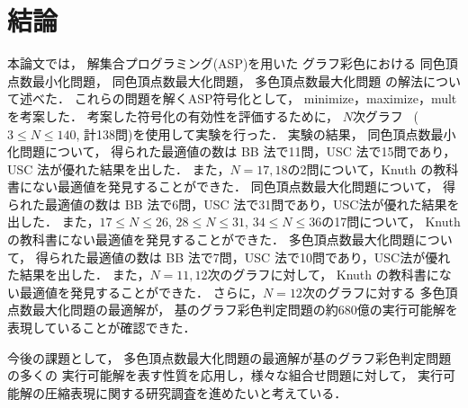 \chapter{結論}\label{chap]conclusion}
本論文では，
解集合プログラミング(ASP)を用いた
グラフ彩色における
同色頂点数最小化問題，
同色頂点数最大化問題，
多色頂点数最大化問題
の解法について述べた．
これらの問題を解くASP符号化として，
\textsf{minimize}，\textsf{maximize}，\textsf{mult}
を考案した．
考案した符号化の有効性を評価するために，
$N$次グラフ~\cite{Knuth:TAOCP:SAT}
($3\leq N\leq 140$, 計138問)を使用して実験を行った．
%
実験の結果，
同色頂点数最小化問題について，
得られた最適値の数は BB 法で11問，USC 法で15問であり，USC 法が優れた結果を出した．
また，$N=17,18$の2問について，Knuth の教科書にない最適値を発見することができた．
%
同色頂点数最大化問題について，
得られた最適値の数は BB 法で6問，USC 法で31問であり，USC法が優れた結果を出した．
また，$17\leq N\leq 26$, $28\leq N\leq 31$, $34\leq N\leq 36$の17問について，
Knuth の教科書にない最適値を発見することができた．
%
多色頂点数最大化問題について，
得られた最適値の数は BB 法で7問，USC 法で10問であり，USC法が優れた結果を出した．
また，$N=11,12$次のグラフに対して，
Knuth の教科書にない最適値を発見することができた．
さらに，$N=12$次のグラフに対する
多色頂点数最大化問題の最適解が，
基のグラフ彩色判定問題の約680億の実行可能解を
表現していることが確認できた．
%

今後の課題として，
多色頂点数最大化問題の最適解が基のグラフ彩色判定問題の多くの
実行可能解を表す性質を応用し，様々な組合せ問題に対して，
実行可能解の圧縮表現に関する研究調査を進めたいと考えている．

